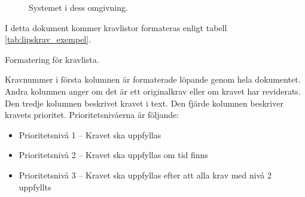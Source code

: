 \documentclass[a4paper,11pt]{article}
\begin{document}
\begin{figure}[h!]
    \caption{Systemet i dess omgivning.}
    \label{fig:overview}
\end{figure}

I detta dokument kommer kravlistor formateras enligt tabell \ref{tab:lipskrav_exempel}.
\begin{table}[h!]
\begin{LIPSkravlista}
\end{LIPSkravlista}
\caption{Formatering för kravlista.}
\label{tab:lipskrav_exempel}
\end{table}

Kravnummer i första kolumnen är formaterade löpande genom hela dokumentet. Andra kolumnen anger om det är ett originalkrav eller om kravet har reviderats. Den tredje kolumnen beskrivet kravet i text. Den fjärde kolumnen beskriver kravets prioritet. Prioritetsnivåerna är följande:
\begin{itemize}
    \item Prioritetsnivå 1 – Kravet ska uppfyllas
    \item Prioritetsnivå 2 – Kravet ska uppfyllas om tid finns
    \item Prioritetsnivå 3 – Kravet ska uppfyllas efter att alla krav med nivå 2 uppfyllts 
\end{itemize}
\end{document}
